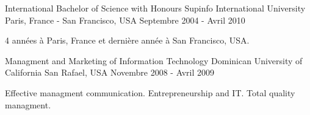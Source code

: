 

\begin{cventries}

    \cventry
    {International Bachelor of Science with Honours} %
    {Supinfo International University} %
    {Paris, France - San Francisco, USA} %
    {Septembre 2004 - Avril 2010} %
    {
    \begin{cvitems} %
        \item {4 années à Paris, France et dernière année à San Francisco, USA.}
    \end{cvitems}
    }

    \cventry
    {Managment and Marketing of Information Technology} %
    {Dominican University of California} %
    {San Rafael, USA} %
    {Novembre 2008 - Avril 2009} %
    {
    \begin{cvitems} %
        \item {Effective managment communication. Entrepreneurship and IT. Total quality managment.}
    \end{cvitems}
    }

\end{cventries}
